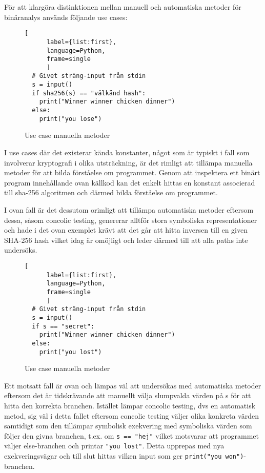 För att klargöra distinktionen mellan manuell och automatiska metoder för
binäranalys används följande use cases:

\begin{figure}
  \begin{lstlisting}[
      label={list:first},
      language=Python,
      frame=single
      ]
  # Givet sträng-input från stdin
  s = input()
  if sha256(s) == "välkänd hash":
    print("Winner winner chicken dinner")
  else:
    print("you lose")
  \end{lstlisting}
  \caption{Use case manuella metoder}
\end{figure}

I use cases där det existerar kända konstanter, något som är typiskt i fall som
involverar kryptografi i olika utsträckning, är det rimligt att tillämpa
manuella metoder för att bilda förståelse om programmet. Genom att inspektera
ett binärt program innehållande ovan källkod kan det enkelt hittas en konstant
associerad till sha-256 algoritmen och därmed bilda förståelse om programmet.

I ovan fall är det dessutom orimligt att tillämpa automatiska metoder eftersom
dessa, såsom concolic testing, genererar alltför stora symboliska
representationer och hade i det ovan exemplet krävt att det går att hitta
inversen till en given SHA-256 hash vilket idag är omöjligt och leder därmed
till att alla paths inte undersöks.

\begin{figure}
  \begin{lstlisting}[
      label={list:first},
      language=Python,
      frame=single
      ]
  # Givet sträng-input från stdin
  s = input()
  if s == "secret":
    print("Winner winner chicken dinner")
  else:
    print("you lost")
  \end{lstlisting}
  \caption{Use case manuella metoder}
\end{figure}

Ett motsatt fall är ovan och lämpas väl att undersökas med automatiska
metoder eftersom det är tidskrävande att manuellt välja slumpvalda värden på s
för att hitta den korrekta branchen. Istället lämpar concolic testing, dvs en
automatisk metod, sig väl i detta fallet eftersom concolic testing väljer olika
konkreta värden samtidigt som den tillämpar symbolisk exekvering med symboliska
värden som följer den givna branchen, t.ex. om \lstinline{s == "hej"} vilket
motsvarar att programmet väljer else-branchen och printar \lstinline{"you lost"}. 
Detta upprepas med nya exekveringsvägar och till slut hittas vilken input som ger
\lstinline{print("you won")}-branchen. 

